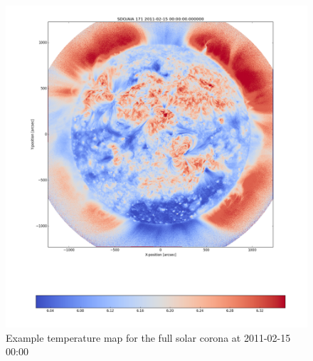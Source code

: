 \documentclass[referee,a4paper,12pt,traditabstract]{swsc}
\begin{document}
\begin{linenumbers}
\begin{figure}
	\centering
		\includegraphics[width=\columnwidth]{2011-02-15T00_00_00.png}
	\caption{Example temperature map for the full solar corona at 2011-02-15 00:00}
	\label{fig:example_tmap}
\end{figure}


\end{linenumbers}
\end{document}
